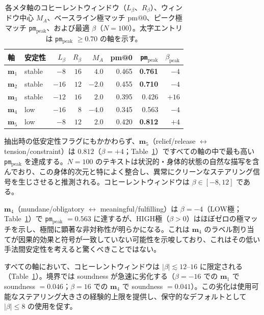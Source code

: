 \begin{table}[H]
\centering
\small
\begin{tabular}{llrrrrrr}
\toprule
\textbf{軸} & \textbf{安定性} & $L_\beta$ & $R_\beta$ & $M_A$ & pm@0 & \texttt{pm}$_\text{peak}$ & $\beta_\mathrm{peak}$ \\
\midrule
$\mathbf{m}_1$ & stable & $-8$  & $16$ & $4.0$  & 0.465 & \textbf{0.761} & $-4$ \\
$\mathbf{m}_2$ & stable & $-16$ & $12$ & $-2.0$ & 0.455 & \textbf{0.710} & $-4$ \\
$\mathbf{m}_3$ & stable & $-12$ & $16$ & $2.0$  & 0.395 & 0.426          & $+16$ \\
$\mathbf{m}_4$ & low    & $-16$ & $8$  & $-4.0$ & 0.345 & 0.563          & $-4$ \\
$\mathbf{m}_5$ & low    & $-8$  & $12$ & $2.0$  & 0.420 & \textbf{0.812} & $+4$ \\
\bottomrule
\end{tabular}
\caption{各メタ軸のコヒーレントウィンドウ（$L_\beta$、$R_\beta$）、ウィンドウ中心 $M_A$、ベースライン極マッチ pm@0、ピーク極マッチ \texttt{pm}$_\text{peak}$、および最適 $\beta$（$N=100$）。太字エントリは \texttt{pm}$_\text{peak}$ $\geq 0.70$ の軸を示す。}\label{tab:exp15_n100_summary}
\end{table}

抽出時の低安定性フラグにもかかわらず、$\mathbf{m}_5$（relief/release $\leftrightarrow$ tension/constraint）は $0.812$（$\beta=+4$；Table~\ref{tab:exp15_n100_summary}）ですべての軸の中で最も高い \texttt{pm}$_\text{peak}$ を達成する。$N=100$ のテキストは状況的・身体的状態の自然な描写を含んでおり、この身体的次元と特によく整合し、異常にクリーンなステアリング信号を生じさせると推測される。コヒーレントウィンドウは $\beta \in [-8, 12]$ である。\par

$\mathbf{m}_4$（mundane/obligatory $\leftrightarrow$ meaningful/fulfilling）は $\beta=-4$（LOW極；Table~\ref{tab:exp15_n100_summary}）で \texttt{pm}$_\text{peak}$ $= 0.563$ に達するが、HIGH極（$\beta > 0$）はほぼゼロの極マッチを示し、極間に顕著な非対称性が明らかになる。これは $\mathbf{m}_4$ のラベル割り当てが因果的効果と符号が一致していない可能性を示唆しており、これはその低い手法間安定性を考えると驚くべきことではない。\par

すべての軸において、コヒーレントウィンドウは $|\beta| \lesssim 12$--$16$ に限定される（Table~\ref{tab:exp15_n100_summary}）。境界では soundness が急速に劣化する（$\beta=-16$ での $\mathbf{m}_1$ で soundness $= 0.046$；$\beta=16$ での $\mathbf{m}_4$ で soundness $= 0.041$）。この劣化は使用可能なステアリング大きさの経験的上限を提供し、保守的なデフォルトとして $|\beta| \leq 8$ の使用を促す。\par

